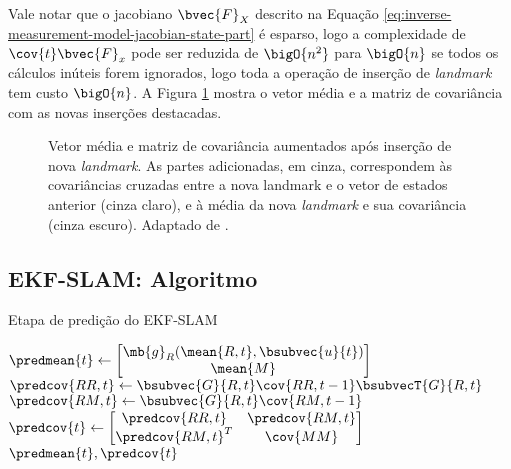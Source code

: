 Vale notar que o jacobiano $\bvec{F}_X$ descrito na Equação \ref{eq:inverse-measurement-model-jacobian-state-part} é esparso, logo a complexidade de $\cov{t}\bvec{F}_x$ pode ser reduzida de $\bigO{n^2}$ para $\bigO{n}$ se todos os cálculos inúteis forem ignorados, logo toda a operação de inserção de \textit{landmark} tem custo $\bigO{n}$. A Figura \ref{fig:ekf-slam-landmark-insertion} mostra o vetor média e a matriz de covariância com as novas inserções destacadas.

\begin{figure}[h]
  \centering
  
  \caption{Vetor média e matriz de covariância aumentados após inserção de nova \textit{landmark}. As partes adicionadas, em cinza, correspondem às covariâncias cruzadas entre a nova landmark e o vetor de estados anterior (cinza claro), e à média da nova \textit{landmark} e sua covariância (cinza escuro). Adaptado de \cite[p.~11]{jsola}.}
  \label{fig:ekf-slam-landmark-insertion}
\end{figure}

\subsection{EKF-SLAM: Algoritmo}

\begin{algorithm}
  \caption{Etapa de predição do EKF-SLAM}
  \label{alg:ekf-slam-prediction}
\begin{algorithmic}[1]
  \State $\predmean{t} \gets \begin{bmatrix}
    \mb{g}_R(\mean{R,t}, \bsubvec{u}{t}) \\ \mean{M}
  \end{bmatrix}$
  \State $\predcov{RR,t} \gets \bsubvec{G}{R, t}\cov{RR, t-1} \bsubvecT{G}{R,t}$
  \State $\predcov{RM, t} \gets \bsubvec{G}{R, t} \cov{RM, t-1}$
  \State $\predcov{t} \gets \begin{bmatrix}
    \predcov{RR, t} & \predcov{RM, t} \\
    \predcov{RM, t}^T & \cov{MM}
  \end{bmatrix}$
  \State \Return $\predmean{t}, \predcov{t}$
\EndProcedure
\end{algorithmic}
\end{algorithm}

